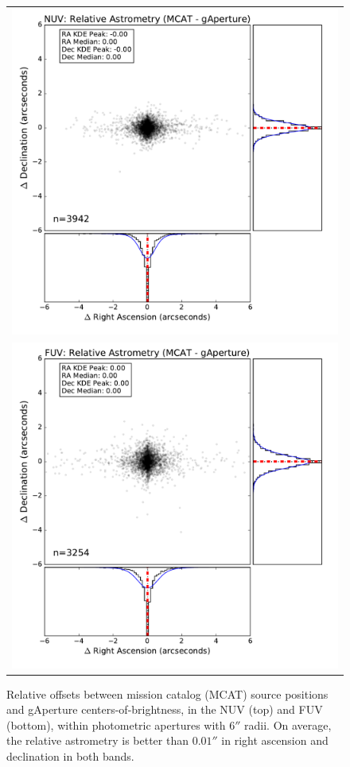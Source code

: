 \documentclass[iop]{emulateapj}
\begin{document}
\begin{figure}[h]
\begin{tabular}{c}
\includegraphics[scale=0.4]{Fig02a.pdf}\\
\includegraphics[scale=0.4]{Fig02b.pdf}\\
\end{tabular}
\caption{Relative offsets between mission catalog (MCAT) source positions and gAperture centers-of-brightness, in the NUV (top) and FUV (bottom), within photometric apertures with $6''$ radii. On average, the relative astrometry is better than $0.01''$ in right ascension and declination in both bands.
\label{astrometry}}
\end{figure}
\end{document}
